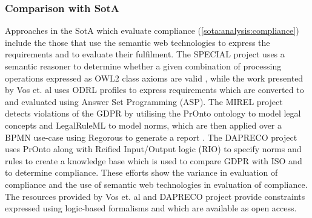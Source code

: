 \subsubsection*{Comparison with SotA}

Approaches in the SotA which evaluate compliance (\autoref{sota:analysis:compliance}) include the those that use the semantic web technologies to express the requirements and to evaluate their fulfilment.
The SPECIAL project uses a semantic reasoner to determine whether a given combination of processing operations expressed as OWL2 class axioms are valid \cite{westphal_spirit_2018}, while the work presented by Vos et. al \cite{vos_odrl_2019} uses ODRL profiles to express requirements which are converted to and evaluated using Answer Set Programming (ASP).
The MIREL project detects violations of the GDPR by utilising the PrOnto ontology \cite{palmirani_pronto_2018,palmirani_pronto_2018-1,monica_modelling_2018} to model legal concepts and LegalRuleML to model norms, which are then applied over a BPMN use-case using Regorous to generate a report \cite{monica_modelling_2018}.
The DAPRECO project uses PrOnto along with Reified Input/Output logic (RIO) \cite{robaldo_reified_2017} to specify norms and rules to create a knowledge base \cite{bartolini_agile_2019} which is used to compare GDPR with ISO and to determine compliance.
These efforts show the variance in evaluation of compliance and the use of semantic web technologies in evaluation of compliance.
The resources provided by Vos et. al \cite{vos_odrl_2019} and DAPRECO project \cite{bartolini_agile_2019} provide constraints expressed using logic-based formalisms and which are available as open access. 


